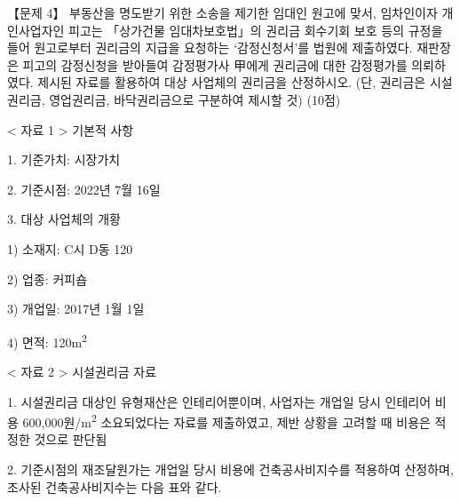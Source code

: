 \begin{longquestion}{【문제 4】}
부동산을 명도받기 위한 소송을 제기한 임대인 원고에 맞서, 임차인이자 개인사업자인 피고는 「상가건물 임대차보호법」의 권리금 회수기회 보호 등의 규정을 들어 원고로부터 권리금의 지급을 요청하는 ‘감정신청서’를 법원에 제출하였다. 재판장은 피고의 감정신청을 받아들여 감정평가사 甲에게 권리금에 대한 감정평가를 의뢰하였다. 제시된 자료를 활용하여 대상 사업체의 권리금을 산정하시오. (단, 권리금은 시설권리금, 영업권리금, 바닥권리금으로 구분하여 제시할 것) (10점) \par
< 자료 1 > 기본적 사항 \par
1. 기준가치: 시장가치 \par
2. 기준시점: 2022년 7월 16일 \par
3. 대상 사업체의 개황 \par
1) 소재지: C시 D동 120 \par
2) 업종: 커피숍 \par
3) 개업일: 2017년 1월 1일 \par
4) 면적: 120m\textsuperscript{2} \par
< 자료 2 > 시설권리금 자료 \par
1. 시설권리금 대상인 유형재산은 인테리어뿐이며, 사업자는 개업일 당시 인테리어 비용 600,000원/m\textsuperscript{2} 소요되었다는 자료를 제출하였고, 제반 상황을 고려할 때 비용은 적정한 것으로 판단됨 \par
2. 기준시점의 재조달원가는 개업일 당시 비용에 건축공사비지수를 적용하여 산정하며, 조사된 건축공사비지수는 다음 표와 같다. \par
{\small\centering\renewcommand{\arraystretch}{1.25}
\par}


\end{longquestion}
